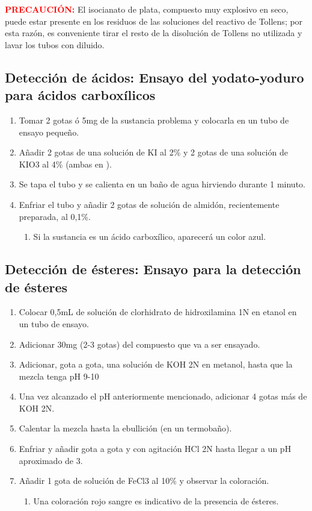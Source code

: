 \bigskip

\textcolor{red}{\textbf{PRECAUCIÓN:}} El isocianato de plata, compuesto muy explosivo en seco, puede estar presente en los residuos de las soluciones del reactivo de Tollens; por esta razón, es conveniente tirar el resto de la disolución de Tollens no utilizada y lavar los tubos con  diluido.




\subsection{Detección de ácidos: Ensayo del yodato-yoduro para ácidos carboxílicos}
\begin{enumerate}
    \item Tomar 2 gotas ó 5mg de la sustancia problema y colocarla en un tubo de ensayo pequeño.
    \item Añadir 2 gotas de una solución de KI al 2\% y 2 gotas de una solución de KIO3 al 4\% (ambas en ).
    \item Se tapa el tubo y se calienta en un baño de agua hirviendo durante 1 minuto.
    \item Enfriar el tubo y añadir 2 gotas de solución de almidón, recientemente preparada, al 0,1\%.
    \begin{enumerate}
        \item Si la sustancia es un ácido carboxílico, aparecerá un color azul.
    \end{enumerate}
\end{enumerate}




\subsection{Detección de ésteres: Ensayo para la detección de ésteres}
\begin{enumerate}
    \item Colocar 0,5mL de solución de clorhidrato de hidroxilamina 1N en etanol en un tubo de ensayo.
    \item Adicionar 30mg (2-3 gotas) del compuesto que va a ser ensayado.
    \item Adicionar, gota a gota, una solución de KOH 2N en metanol, hasta que la mezcla tenga pH 9-10
    \item Una vez alcanzado el pH anteriormente mencionado, adicionar 4 gotas más de KOH 2N.
    \item Calentar la mezcla hasta la ebullición (en un termobaño).
    \item Enfriar y añadir gota a gota y con agitación HCl 2N hasta llegar a un pH aproximado de 3.
    \item Añadir 1 gota de solución de FeCl3 al 10\% y observar la coloración.
    \begin{enumerate}
        \item Una coloración rojo sangre es indicativo de la presencia de ésteres.
    \end{enumerate}
\end{enumerate}